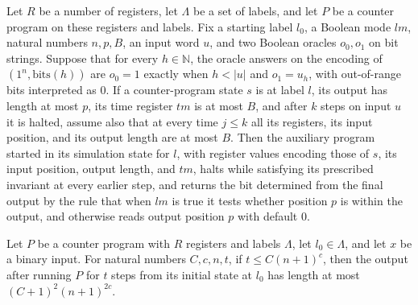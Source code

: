 \begin{lemma}
\label{Complexity.CPSim.sim_run}
\leanok
{}
Let $R$ be a number of registers, let $\Lambda$ be a set of labels, and let $P$ be a
counter program on these registers and labels. Fix a starting label $l_0$, a Boolean
mode $lm$, natural numbers $n,p,B$, an input word $u$, and two Boolean oracles $o_0,o_1$
on bit strings. Suppose that for every $h\in\mathbb N$, the oracle answers on the
encoding of $(1^n,\mathrm{bits}(h))$ are $o_0=1$ exactly when $h<|u|$ and $o_1=u_h$,
with out-of-range bits interpreted as $0$. If a counter-program state $s$ is at label
$l$, its output has length at most $p$, its time register $tm$ is at most $B$, and after
$k$ steps on input $u$ it is halted, assume also that at every time $j\le k$ all its
registers, its input position, and its output length are at most $B$. Then the auxiliary
program started in its simulation state for $l$, with register values encoding those of
$s$, its input position, output length, and $tm$, halts while satisfying its prescribed
invariant at every earlier step, and returns the bit determined from the final output by
the rule that when $lm$ is true it tests whether position $p$ is within the output, and
otherwise reads output position $p$ with default $0$.
\end{lemma}

\begin{theorem}
\label{Complexity.CounterProg.length_out_le}
\leanok
{}
Let $P$ be a counter program with $R$ registers and labels $\Lambda$, let
$l_0\in\Lambda$, and let $x$ be a binary input. For natural numbers $C,c,n,t$, if $t\le
C(n+1)^c$, then the output after running $P$ for $t$ steps from its initial state at
$l_0$ has length at most $(C+1)^2(n+1)^{2c}$.
\end{theorem}

